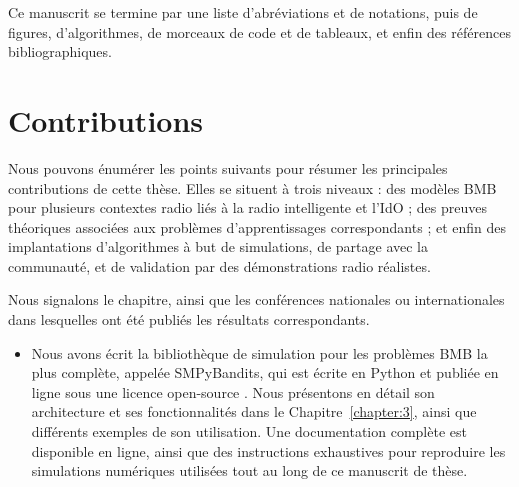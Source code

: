 \begin{resume_fr}
%
Ce manuscrit se termine par
une liste d'abréviations et de notations, puis de figures, d'algorithmes, de morceaux de code et de tableaux,
et enfin des références bibliographiques.




\section*{Contributions}

Nous pouvons énumérer les points suivants pour résumer les principales contributions de cette thèse.
Elles se situent à trois niveaux : des modèles BMB pour plusieurs contextes radio liés à la radio intelligente et l'IdO ; des preuves théoriques associées aux problèmes d'apprentissages correspondants ; et enfin des implantations d'algorithmes à but de simulations, de partage avec la communauté, et de validation par des démonstrations radio réalistes.

Nous signalons le chapitre, ainsi que les conférences nationales ou internationales dans lesquelles ont été publiés les résultats correspondants.

\begin{itemize}


    \item
    Nous avons écrit la bibliothèque de simulation pour les problèmes BMB la plus complète, appelée SMPyBandits, qui est écrite en Python et publiée en ligne sous une licence open-source \cite{SMPyBanditsJMLR,SMPyBandits}.
    Nous présentons en détail son architecture et ses fonctionnalités dans le Chapitre~\ref{chapter:3}, ainsi que différents exemples de son utilisation.
    Une documentation complète est disponible en ligne, ainsi que des instructions exhaustives pour reproduire les simulations numériques utilisées tout au long de ce manuscrit de thèse.


\end{itemize}
\end{resume_fr}
